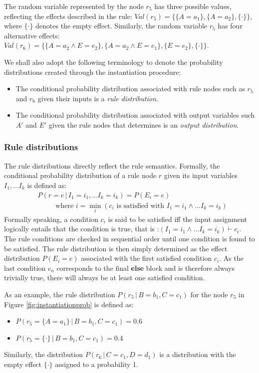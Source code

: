 The random variable represented by the node $r_5$ has three possible values, reflecting the effects described in the rule: $Val(r_5) = \{ \{A\!=\!a_1\}, \{A\!=\!a_2\}, \{\cdot\}\}$, where $\{\cdot\}$ denotes the empty effect.  Similarly, the random variable $r_5$ has four alternative effects: $Val(r_6) = \{\{A\!=\!a_2 \land E\!=\!e_2\}, \{A\!=\!a_2 \land E\!=\!e_1\}, \{E=e_2\}, \{\cdot\}\}$. 

We shall also adopt the following terminology to denote the probability distributions created through the instantiation procedure: 
\begin{itemize}
\item The conditional probability distribution associated with rule nodes such as $r_5$ and $r_6$ given their inputs is a \textit{rule distribution}.
\item The conditional probability distribution associated with output variables such $A'$ and $E'$ given the rule nodes that determines is an \textit{output distribution}.
\end{itemize}

\subsubsection*{Rule distributions}

The rule distributions directly reflect the rule semantics.  Formally, the conditional probability distribution of a rule node $r$ given its input variables $I_1,...I_k$ is defined as: 
\begin{align}
& P(r\!=\!e \, | \, I_1\!=\!i_1,... I_k\!=\!i_k) = P(E_i = e) \label{eq:ruledistrib}
 \\ 
& \; \; \; \; \; \; \; \; \text{ where } i = \min_i (c_i \text{ is satisfied with } I_1\!=\!i_1 \land ... I_k\!=\!i_k) \nonumber 
\end{align}
Formally speaking, a condition $c_i$ is said to be satisfied iff the input assignment logically entails that the condition is true, that is :$(I_1\!=\!i_1 \land ... I_k\!=\!i_k) \vdash c_i$. The rule conditions are checked in sequential order until one condition is found to be satisfied. The rule distribution is then simply determined as the effect distribution $P(E_i\!=\!e)$ associated with the first satisfied condition $c_i$.  As the last condition $c_n$ corresponds to the final \textbf{else} block and is therefore always trivially true, there will always be at least one satisfied condition. 

As an example, the rule distribution $P(r_5 \, | \, B\!=\!b_1, C\!=\!c_1)$ for the node $r_5$ in Figure \ref{fig:instantiationprob} is defined as:
\begin{itemize}
\item $P(r_5 = \{A\!=\!a_1\} \, | \, B\!=\!b_1, C\!=\!c_1) = 0.6$
\item  $P(r_5 = \{\cdot\} \, | \, B\!=\!b_1, C\!=\!c_1) = 0.4$
\end{itemize}
Similarly, the distribution $P(r_6 \, | \, C\!=\!c_1, D\!=\!d_1)$ is a distribution with the empty effect $\{\cdot\}$ assigned to a probability 1. 

